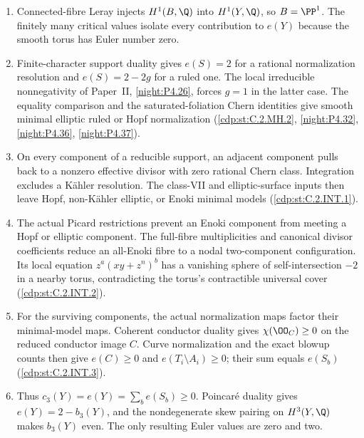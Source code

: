 \begin{enumerate}[label=\arabic*.,leftmargin=*]
\item Connected-fibre Leray injects $H^1(B,\Q)$ into
$H^1(Y,\Q)$, so $B=\PP^1$.  The finitely many critical
values isolate every contribution to $e(Y)$ because the
smooth torus has Euler number zero.
\item Finite-character support duality gives $e(S)=2$ for a
rational normalization resolution and $e(S)=2-2g$ for a ruled
one. The local irreducible nonnegativity of Paper~II,
\ref{night:P4.26}, forces $g=1$ in the latter case.
The equality comparison and the saturated-foliation Chern
identities give smooth minimal elliptic ruled or Hopf
normalization (\ref{cdp:st:C.2.MH.2}, \ref{night:P4.32},
\ref{night:P4.36}, \ref{night:P4.37}).
\item On every component of a reducible support, an adjacent
component pulls back to a nonzero effective divisor with
zero rational Chern class.  Integration excludes a K\"ahler
resolution.  The class-VII and elliptic-surface inputs then
leave Hopf, non-K\"ahler elliptic, or Enoki minimal models
(\ref{cdp:st:C.2.INT.1}).
\item The actual Picard restrictions prevent an Enoki
component from meeting a Hopf or elliptic component.
The full-fibre multiplicities and canonical divisor
coefficients reduce an all-Enoki fibre to a nodal
two-component configuration.  Its local equation
$z^a(xy+z^n)^b$ has a vanishing sphere of self-intersection
$-2$ in a nearby torus, contradicting the torus's
contractible universal cover (\ref{cdp:st:C.2.INT.2}).
\item For the surviving components, the actual normalization
maps factor their minimal-model maps.  Coherent conductor
duality gives $\chi(\OO_{C})\ge0$ on the reduced conductor
image $C$.  Curve normalization and the exact blowup counts
then give $e(C)\ge0$ and
$e(T_i\setminus A_i)\ge0$; their sum equals $e(S_b)$
(\ref{cdp:st:C.2.INT.3}).
\item Thus $c_3(Y)=e(Y)=\sum_b e(S_b)\ge0$.
Poincar\'e duality gives $e(Y)=2-b_3(Y)$, and the
nondegenerate skew pairing on $H^3(Y,\Q)$ makes $b_3(Y)$
even.  The only resulting Euler values are zero and two.
\end{enumerate}


